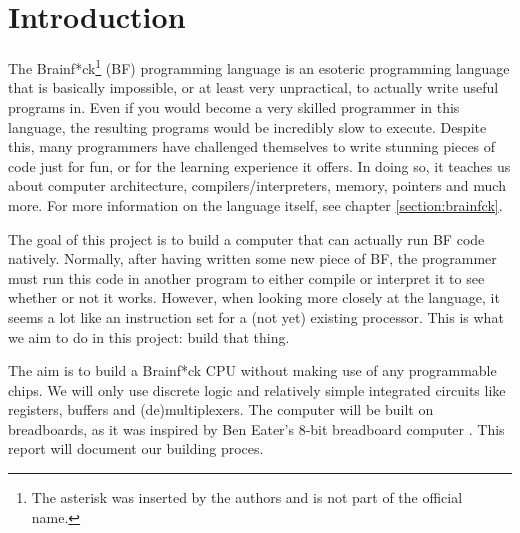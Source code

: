 \section{Introduction}
The Brainf*ck\footnote{The asterisk was inserted by the authors and is not part of the official name.} (BF) programming language is an esoteric programming language that is basically impossible, or at least very unpractical, to actually write useful programs in. Even if you would become a very skilled programmer in this language, the resulting programs would be incredibly slow to execute. Despite this, many programmers have challenged themselves to write stunning pieces of code just for fun, or for the learning experience it offers. In doing so, it teaches us about computer architecture, compilers/interpreters, memory, pointers and much more. For more information on the language itself, see chapter \ref{section:brainfck}.

The goal of this project is to build a computer that can actually run BF code natively. Normally, after having written some new piece of BF, the programmer must run this code in another program to either compile or interpret it to see whether or not it works. However, when looking more closely at the language, it seems a lot like an instruction set for a (not yet) existing processor. This is what we aim to do in this project: build that thing.

The aim is to build a Brainf*ck CPU without making use of any programmable chips. We will only use discrete logic and relatively simple integrated circuits like registers, buffers and (de)multiplexers. The computer will be built on breadboards, as it was inspired by Ben Eater's 8-bit breadboard computer \cite{beneater}. This report will document our building proces.
